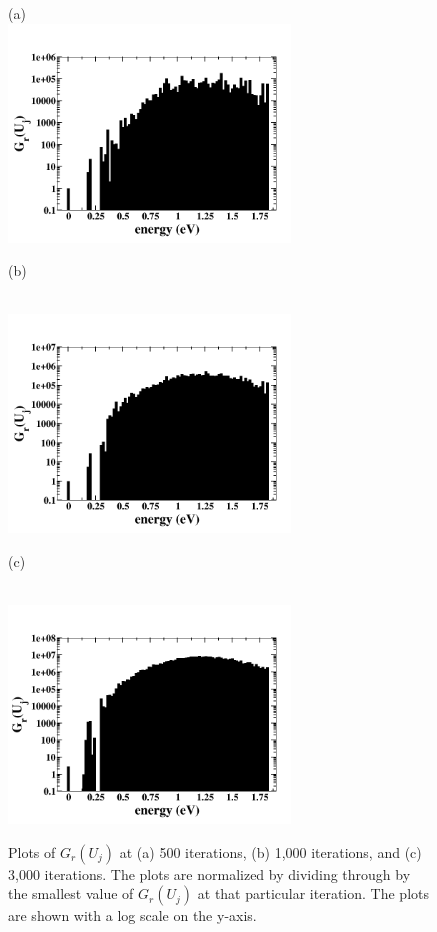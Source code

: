\documentclass[aps,pre,reprint,superscriptaddress,showkeys]{revtex4-1}
\begin{document}
\begin{figure}[h!]
(a)\\
\includegraphics[width=7.5cm]{./figures/GE_fig_500.png}
\centerline{(b)}\\
\includegraphics[width=7.5cm]{./figures/GE_fig_1000.png}
\centerline{(c)}\\
\includegraphics[width=7.5cm]{./figures/GE_fig_3000.png}
\caption{Plots of $G_r(U_j)$ at (a) 500 iterations, (b) 1,000 iterations, and (c) 3,000 iterations. The plots are normalized by dividing through by the smallest value of $G_r(U_j)$ at that particular iteration. The plots are shown with a log scale on the y-axis.  \label{converge_GE}}
\end{figure}
\end{document}
